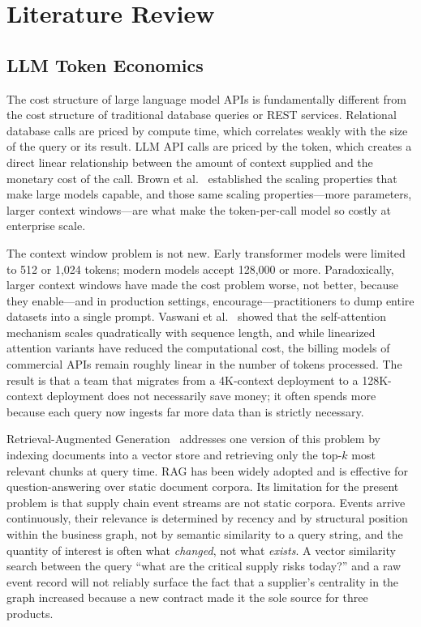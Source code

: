 \chapter{Literature Review}
\label{ch:literature_review}

\section{LLM Token Economics}
\label{sec:token_economics}

The cost structure of large language model APIs is fundamentally different from the cost
structure of traditional database queries or REST services. Relational database calls are
priced by compute time, which correlates weakly with the size of the query or its result.
LLM API calls are priced by the token, which creates a direct linear relationship between
the amount of context supplied and the monetary cost of the call. Brown et al.~\citep{brown2020gpt3}
established the scaling properties that make large models capable, and those same scaling
properties---more parameters, larger context windows---are what make the token-per-call
model so costly at enterprise scale.

The context window problem is not new. Early transformer models were limited to 512 or
1,024 tokens; modern models accept 128,000 or more. Paradoxically, larger context windows
have made the cost problem worse, not better, because they enable---and in production
settings, encourage---practitioners to dump entire datasets into a single prompt. Vaswani
et al.~\citep{vaswani2017attention} showed that the self-attention mechanism scales
quadratically with sequence length, and while linearized attention variants have reduced
the computational cost, the billing models of commercial APIs remain roughly linear in the
number of tokens processed. The result is that a team that migrates from a 4K-context
deployment to a 128K-context deployment does not necessarily save money; it often spends
more because each query now ingests far more data than is strictly necessary.

Retrieval-Augmented Generation~\citep{lewis2020rag} addresses one version of this problem
by indexing documents into a vector store and retrieving only the top-$k$ most relevant
chunks at query time. RAG has been widely adopted and is effective for question-answering
over static document corpora. Its limitation for the present problem is that supply chain
event streams are not static corpora. Events arrive continuously, their relevance is
determined by recency and by structural position within the business graph, not by semantic
similarity to a query string, and the quantity of interest is often what \emph{changed},
not what \emph{exists}. A vector similarity search between the query ``what are the
critical supply risks today?'' and a raw event record will not reliably surface the fact
that a supplier's centrality in the graph increased because a new contract made it the
sole source for three products.

